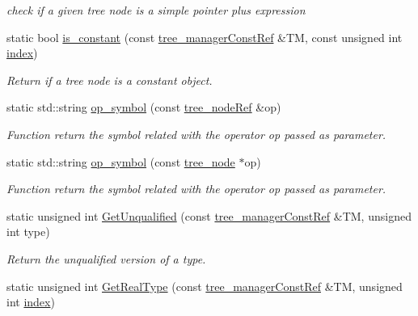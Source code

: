 \begin{DoxyCompactItemize}
\begin{DoxyCompactList}\small\item\em check if a given tree node is a simple pointer plus expression \end{DoxyCompactList}\item 
static bool \hyperlink{classtree__helper_a2a4c47da4a2b504b5700a9f3ee5e9463}{is\+\_\+constant} (const \hyperlink{tree__manager_8hpp_a792e3f1f892d7d997a8d8a4a12e39346}{tree\+\_\+manager\+Const\+Ref} \&TM, const unsigned int \hyperlink{tutorial__pact__2019_2Introduction_2third_2include_2Keccak_8h_a028c9bdc8344cca38ab522a337074797}{index})
\begin{DoxyCompactList}\small\item\em Return if a tree node is a constant object. \end{DoxyCompactList}\item 
static std\+::string \hyperlink{classtree__helper_afe92ad7fb9854908aa7b11f4bdb89e67}{op\+\_\+symbol} (const \hyperlink{tree__node_8hpp_a6ee377554d1c4871ad66a337eaa67fd5}{tree\+\_\+node\+Ref} \&op)
\begin{DoxyCompactList}\small\item\em Function return the symbol related with the operator op passed as parameter. \end{DoxyCompactList}\item 
static std\+::string \hyperlink{classtree__helper_a3bddb21e3d1fd325d9949e94c3e84381}{op\+\_\+symbol} (const \hyperlink{classtree__node}{tree\+\_\+node} $\ast$op)
\begin{DoxyCompactList}\small\item\em Function return the symbol related with the operator op passed as parameter. \end{DoxyCompactList}\item 
static unsigned int \hyperlink{classtree__helper_ad16dad59416cc21add3fbf84adeef1b4}{Get\+Unqualified} (const \hyperlink{tree__manager_8hpp_a792e3f1f892d7d997a8d8a4a12e39346}{tree\+\_\+manager\+Const\+Ref} \&TM, unsigned int type)
\begin{DoxyCompactList}\small\item\em Return the unqualified version of a type. \end{DoxyCompactList}\item 
static unsigned int \hyperlink{classtree__helper_a0b08c720b4d1a44705b5bbc47b915f79}{Get\+Real\+Type} (const \hyperlink{tree__manager_8hpp_a792e3f1f892d7d997a8d8a4a12e39346}{tree\+\_\+manager\+Const\+Ref} \&TM, unsigned int \hyperlink{tutorial__pact__2019_2Introduction_2third_2include_2Keccak_8h_a028c9bdc8344cca38ab522a337074797}{index})

\end{DoxyCompactItemize}
